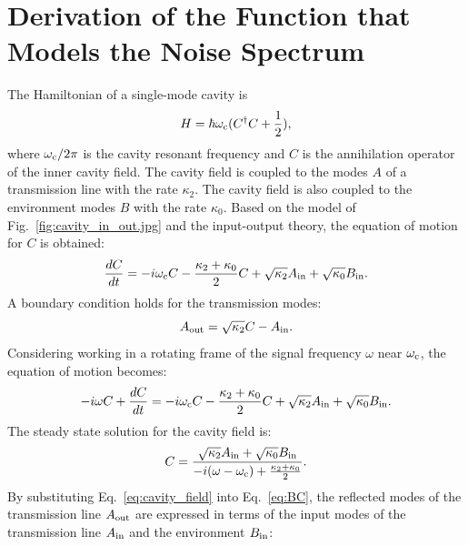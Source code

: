 \section{Derivation of the Function that Models the Noise Spectrum} 
\label{sec:cavitynoise}

The Hamiltonian of a single-mode cavity is
\begin{equation}
\label{eq:cavity_Hamiltonian}
    H = \hbar \omega_{\rm c}(C^{\dagger}C+\frac{1}{2}),
\end{equation}
where $\omega_{\rm c}/2\pi$ is the cavity resonant frequency and $C$ is the 
annihilation operator of the inner cavity field. The cavity field is coupled 
to the modes $A$ of a transmission line with the rate $\kappa_2$. The cavity 
field is also coupled to the environment modes $B$ with the rate $\kappa_0$. 
Based on the model of Fig.~\ref{fig:cavity_in_out.jpg} and the input-output 
theory, the equation of motion for $C$ is obtained:
\begin{equation}
\label{eq:EOM}
    \frac{dC}{dt} = -i\omega_{\rm c} C - \frac{\kappa_2+\kappa_0}{2} C + \sqrt{\kappa_2} A_{\rm in} + \sqrt{\kappa_0}B_{\rm in}.
\end{equation}
A boundary condition holds for the transmission modes:
\begin{equation}
\label{eq:BC}
    A_{\rm out} = \sqrt{\kappa_2} C - A_{\rm in}.
\end{equation}
Considering working in a rotating frame of the signal frequency $\omega$ near 
$\omega_{\rm c}$, the equation of motion becomes:
\begin{equation}
\label{eq:EOM_rotating_frame}
    -i\omega C + \frac{dC}{dt} = -i \omega_{\rm c} C - \frac{\kappa_2+\kappa_0}{2} C + \sqrt{\kappa_2} A_{\rm in} + \sqrt{\kappa_0} B_{\rm in}.
\end{equation}
The steady state solution for the cavity field is: 
\begin{equation}
\label{eq:cavity_field}
    C = \frac {\sqrt{\kappa_2} A_{\rm in} + \sqrt{\kappa_0} B_{\rm in}} {-i (\omega-\omega_{\rm c}) + \frac{\kappa_2+\kappa_0}{2} }.
\end{equation}
By substituting Eq.~\eqref{eq:cavity_field} into Eq.~\eqref{eq:BC}, the 
reflected modes of the transmission line $A_{\rm out}$ are expressed in terms 
of the input modes of the transmission line $A_{\rm in}$ and the environment 
$B_{\rm in}$:
